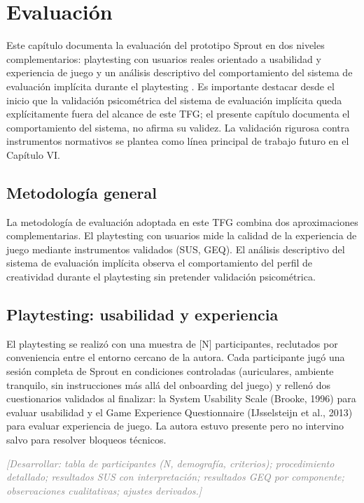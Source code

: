 \documentclass[12pt,twoside,titlepage]{report}
\begin{document}
\chapter{Evaluación}

Este capítulo documenta la evaluación del prototipo Sprout en dos niveles complementarios: playtesting con usuarios reales orientado a usabilidad y experiencia de juego  y un análisis descriptivo del comportamiento del sistema de evaluación implícita durante el playtesting . Es importante destacar desde el inicio que la validación psicométrica del sistema de evaluación implícita queda explícitamente fuera del alcance de este TFG; el presente capítulo documenta el comportamiento del sistema, no afirma su validez. La validación rigurosa contra instrumentos normativos se plantea como línea principal de trabajo futuro en el Capítulo VI.

\section{Metodología general}

La metodología de evaluación adoptada en este TFG combina dos aproximaciones complementarias. El playtesting con usuarios mide la calidad de la experiencia de juego mediante instrumentos validados (SUS, GEQ). El análisis descriptivo del sistema de evaluación implícita observa el comportamiento del perfil de creatividad durante el playtesting sin pretender validación psicométrica.

\section{Playtesting: usabilidad y experiencia}

El playtesting se realizó con una muestra de [N] participantes, reclutados por conveniencia entre el entorno cercano de la autora. Cada participante jugó una sesión completa de Sprout en condiciones controladas (auriculares, ambiente tranquilo, sin instrucciones más allá del onboarding del juego) y rellenó dos cuestionarios validados al finalizar: la System Usability Scale (Brooke, 1996) para evaluar usabilidad y el Game Experience Questionnaire (IJsselsteijn et al., 2013) para evaluar experiencia de juego. La autora estuvo presente pero no intervino salvo para resolver bloqueos técnicos.

\textcolor{gray}{\textit{[Desarrollar: tabla de participantes (N, demografía, criterios); procedimiento detallado; resultados SUS con interpretación; resultados GEQ por componente; observaciones cualitativas; ajustes derivados.]}}
\end{document}
